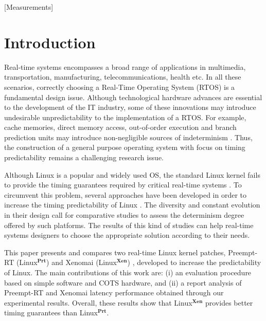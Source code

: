 \documentclass{acm_proc_article-sp}
\newcommand{\preemptt}{{Preempt-RT }}
\begin{document}
[Measurements]




\section{Introduction}

Real-time systems encompasses a broad range of applications in multimedia,
transportation, manufacturing, telecommunications, health etc. In all these
scenarios, correctly choosing a Real-Time Operating System (RTOS) is a fundamental
design issue. Although technological hardware advances are essential to the
development of the IT industry, some of these innovations may introduce undesirable
unpredictability to the implementation of a RTOS. For example, cache memories,
direct memory access, out-of-order execution and branch prediction units may
introduce non-negligible sources of indeterminism \cite{Liu00, Pratt04}. Thus, the
construction of a general purpose operating system with focus on timing
predictability remains a challenging research issue.

Although Linux is a popular and widely used OS, the standard Linux kernel
\cite{Bovet05} fails to provide the timing guarantees required by critical real-time
systems \cite{Marchesotti06, Abeni02}. To circumvent this problem, several
approaches have been developed in order to increase the timing predictability of
Linux \cite{PreemptRT, Xenomai, Dozio03, Barabanov97, Fry07, Calandrino06}. The
diversity and constant evolution in their design call for comparative studies to
assess the determinism degree offered by such platforms. The results of this kind
of studies can help real-time systems designers to choose the appropriate solution
according to their needs.

This paper presents and compares two real-time Linux kernel patches, \preemptt
(Linux$^{\mathbf{Prt}}$) \cite{PreemptRT} and Xenomai \linebreak \noindent
(Linux$^{\mathbf{Xen}}$) \cite{Xenomai}, developed to increase the predictability of
Linux. The main contributions of this work are: (i) an evaluation procedure based on
simple software and COTS hardware, and (ii) a report analysis of \preemptt and
Xenomai latency performance obtained through our experimental results. Overall,
these results show that Linux$^{\mathbf{Xen}}$ provides better timing guarantees
than Linux$^{\mathbf{Prt}}$.
\end{document}
